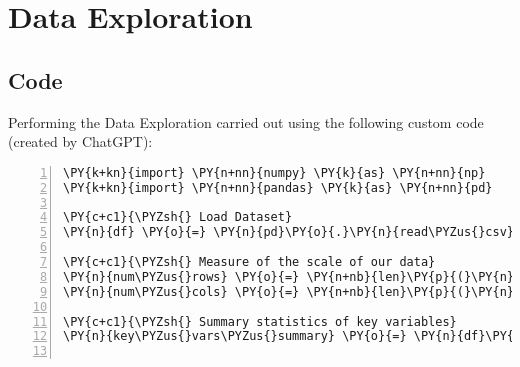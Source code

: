 \documentclass[12pt]{article}
\begin{document}
\section{Data Exploration} \subsection{Code}Performing the Data Exploration carried out using the following custom code (created by ChatGPT):

\begin{Verbatim}[commandchars=\\\{\},numbers=left,firstnumber=1,stepnumber=1,formatcom=\footnotesize]
\PY{k+kn}{import} \PY{n+nn}{numpy} \PY{k}{as} \PY{n+nn}{np}
\PY{k+kn}{import} \PY{n+nn}{pandas} \PY{k}{as} \PY{n+nn}{pd}

\PY{c+c1}{\PYZsh{} Load Dataset}
\PY{n}{df} \PY{o}{=} \PY{n}{pd}\PY{o}{.}\PY{n}{read\PYZus{}csv}\PY{p}{(}\PY{l+s+s2}{\PYZdq{}}\PY{l+s+s2}{diabetes\PYZus{}binary\PYZus{}health\PYZus{}indicators\PYZus{}BRFSS2015.csv}\PY{l+s+s2}{\PYZdq{}}\PY{p}{)}

\PY{c+c1}{\PYZsh{} Measure of the scale of our data}
\PY{n}{num\PYZus{}rows} \PY{o}{=} \PY{n+nb}{len}\PY{p}{(}\PY{n}{df}\PY{p}{)}
\PY{n}{num\PYZus{}cols} \PY{o}{=} \PY{n+nb}{len}\PY{p}{(}\PY{n}{df}\PY{o}{.}\PY{n}{columns}\PY{p}{)}

\PY{c+c1}{\PYZsh{} Summary statistics of key variables}
\PY{n}{key\PYZus{}vars\PYZus{}summary} \PY{o}{=} \PY{n}{df}\PY{p}{[}\PY{p}{[}\PY{l+s+s1}{\PYZsq{}}\PY{l+s+s1}{BMI}\PY{l+s+s1}{\PYZsq{}}\PY{p}{,} \PY{l+s+s1}{\PYZsq{}}\PY{l+s+s1}{Age}\PY{l+s+s1}{\PYZsq{}}\PY{p}{]}\PY{p}{]}\PY{o}{.}\PY{n}{describe}\PY{p}{(}\PY{p}{)}


\end{Verbatim}
\end{document}
